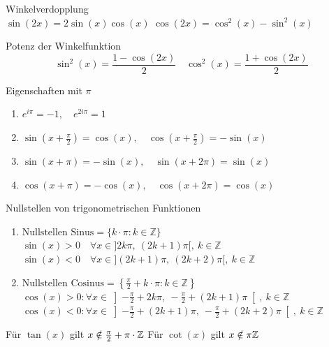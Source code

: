  \begin{corollary}{Winkelverdopplung}\\
         $\sin(2x) = 2 \sin(x)\cos(x)$ \hspace{4mm} $\cos(2x) = \cos^2(x) - \sin^2(x)$
 \end{corollary}
 \begin{corollary}{Potenz der Winkelfunktion}\\
    $$\sin^2(x) = \frac{1 - \cos(2x)}{2} \quad \cos^2(x) = \frac{1 + \cos(2x)}{2}$$
 \end{corollary}
 \begin{corollary}{Eigenschaften mit $\pi$}
     \begin{enumerate}[itemsep= 2pt]
         \item $e^{i\pi} = -1, \quad e^{2i\pi} = 1$
         \item $\sin\left(x + \frac{\pi}{2}\right) = \cos(x), \quad \cos\left(x + \frac{\pi}{2}\right) = -\sin(x)$
         \item $\sin(x+\pi) = -\sin (x), \quad \sin(x + 2\pi) = \sin(x)$
         \item $\cos(x+\pi) = -\cos (x), \quad \cos(x + 2\pi) = \cos(x)$
     \end{enumerate}
 \end{corollary}

 \begin{corollary}{Nullstellen von trigonometrischen Funktionen}
    \begin{enumerate}
         \item $\text{Nullstellen Sinus} = \{k\cdot \pi : k\in \mathbb{Z}\}$\\
        $\sin(x) > 0 \quad \forall x \in ]2k\pi, ~(2k+1)\pi[, ~ k\in \mathbb{Z}$\\[2pt]
        $\sin(x) < 0 \quad \forall x \in ](2k + 1)\pi, ~(2k+2)\pi[, ~ k\in \mathbb{Z}$
        \item $\text{Nullstellen Cosinus} = \left\{\frac{\pi}{2}+k\cdot \pi : k\in \mathbb{Z}\right\}$\\
        $\cos(x) > 0:\forall x \in \left]-\frac{\pi}{2} +2k\pi, ~-\frac{\pi}{2} +(2k+1)\pi\right[, ~ k\in \mathbb{Z}$\\[2pt]
        $\cos(x) < 0:\forall x \in \left]-\frac{\pi}{2} + (2k + 1)\pi, ~-\frac{\pi}{2} +(2k+2)\pi\right[, ~ k\in \mathbb{Z}$
    \end{enumerate}
\end{corollary}
\noindent Für $\tan(x)$ gilt $x \notin \frac{\pi}{2} + \pi \cdot \mathbb{Z}$ \qquad Für $\cot(x)$ gilt $x \notin \pi \mathbb{Z}$
 

